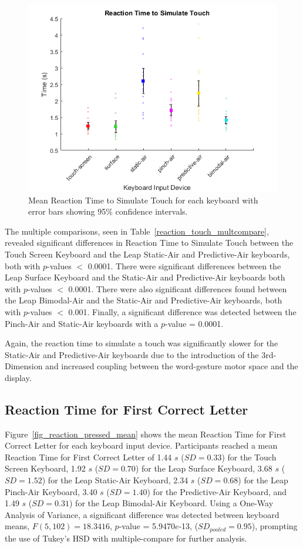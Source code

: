 \begin{figure}[h]
	\centering
	\includegraphics{fig_reaction_touch_mean}
	\caption[Mean Reaction Time to Simulate Touch]{Mean Reaction Time to Simulate Touch for each keyboard with error bars showing 95\% confidence intervals.}
	\label{fig_reaction_touch_mean}
\end{figure}

The multiple comparisons, seen in Table~\ref{reaction_touch_multcompare}, revealed significant differences in Reaction Time to Simulate Touch between the Touch Screen Keyboard and the Leap Static-Air and Predictive-Air keyboards, both with $p$-values $<$ 0.0001. There were significant differences between the Leap Surface Keyboard and the Static-Air and Predictive-Air keyboards both with $p$-values $<$ 0.0001. There were also significant differences found between the Leap Bimodal-Air and the Static-Air and Predictive-Air keyboards, both with $p$-values $<$ 0.001. Finally, a significant difference was detected between the Pinch-Air and Static-Air keyboards with a $p$-value = 0.0001.

Again, the reaction time to simulate a touch was significantly slower for the Static-Air and Predictive-Air keyboards due to the introduction of the 3rd-Dimension and increased coupling between the word-gesture motor space and the display.

\subsection{Reaction Time for First Correct Letter}
Figure~\ref{fig_reaction_pressed_mean} shows the mean Reaction Time for First Correct Letter for each keyboard input device. Participants reached a mean Reaction Time for First Correct Letter of 1.44 $s$ ($SD = 0.33$) for the Touch Screen Keyboard, 1.92 $s$ ($SD = 0.70$) for the Leap Surface Keyboard, 3.68 $s$ ($SD = 1.52$) for the Leap Static-Air Keyboard, 2.34 $s$ ($SD = 0.68$) for the Leap Pinch-Air Keyboard, 3.40 $s$ ($SD = 1.40$) for the Predictive-Air Keyboard, and 1.49 $s$ ($SD = 0.31$) for the Leap Bimodal-Air Keyboard. Using a One-Way Analysis of Variance, a significant difference was detected between keyboard means, $F(5, 102) = 18.3416$, $p$-value = 5.9470$e$-13, ($SD_{pooled} = 0.95$), prompting the use of Tukey's HSD with multiple-compare for further analysis.

